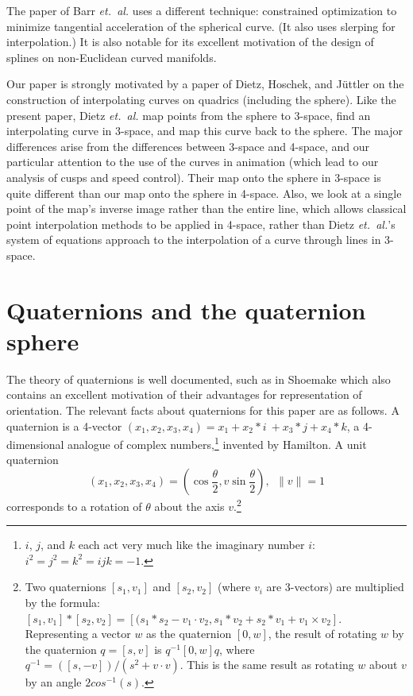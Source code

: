 The paper of Barr {\em et.\ al.} \cite{barr92} uses a different technique:
constrained optimization to minimize
tangential acceleration of the spherical curve.
(It also uses slerping for interpolation.)
It is also notable for its excellent motivation of the
design of splines on non-Euclidean curved manifolds.


Our paper is strongly motivated by %
a paper of Dietz, Hoschek, and J\"{u}ttler
\cite{dietz93} on the construction of interpolating curves on quadrics 
(including the sphere).
Like the present paper, Dietz {\em et.\ al.} map points from the sphere to
3-space, find an interpolating curve in 3-space, and map this curve back
to the sphere.
The major differences arise from the differences between 3-space and
4-space, and our particular attention to the use of the curves in
animation (which lead to our analysis of cusps and speed control).
Their map onto the sphere in 3-space is quite different than our map onto the
sphere in 4-space.
Also, we look at a single point of the map's inverse image rather than the
entire line,
which allows classical point interpolation methods to be applied in 4-space,
rather than Dietz {\em et.\ al.}'s system of equations approach to the interpolation 
of a curve through lines in 3-space.

\section{Quaternions and the quaternion sphere}
\label{sec:quaternion}

The theory of quaternions is well documented, such as in Shoemake
\cite{shoemake85} which also contains an excellent motivation of their
advantages for representation of orientation.
The relevant facts about quaternions for this paper are as follows.
%
A quaternion is a 4-vector $(x_1,x_2,x_3,x_4) = x_1 + \mbox{$x_2*i$}~
+ x_3*j +
x_4*k$, a 4-dimensional analogue of complex numbers,\footnote{$i$, $j$,
	and $k$ each act very much like the imaginary number $i$:
	$i^2 = j^2 = k^2 = ijk = -1$.}
invented by Hamilton.
A unit quaternion 
\[ (x_1,x_2,x_3,x_4) 
= (\cos \frac{\theta}{2}, v \sin \frac{\theta}{2}), \ \ \|v\| = 1
\]
corresponds to a rotation of $\theta$ about the axis $v$.\footnote{Two
	quaternions $[s_1,v_1]$ and $[s_2,v_2]$ (where $v_i$ are 3-vectors)
	are multiplied by the formula: 
	$[s_1,v_1] * [s_2,v_2] = [(s_1*s_2 - v_1 \cdot v_2,
		s_1*v_2 + s_2*v_1 + v_1 \times v_2]$.
	Representing a vector $w$ as the quaternion $[0,w]$,
	the result of rotating $w$ by the quaternion $q = [s,v]$ is
	$q^{-1} [0,w] q$, where $q^{-1} = ([s,-v])/(s^2 + v \cdot v)$.
	This is the same result as rotating $w$ about $v$ by an angle 
	$2 cos^{-1}(s)$.}

